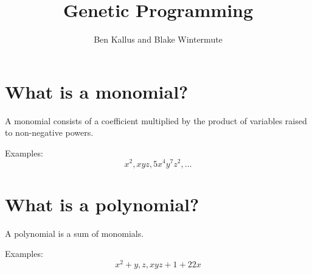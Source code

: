 \documentclass[12pt]{article}
\title{Genetic Programming}
\author{Ben Kallus and Blake Wintermute}
\date{ }
\begin{document}
\pagecolor{black}
\color{white}
\maketitle

\section*{What is a monomial?}

    A monomial consists of a coefficient multiplied by the product of variables raised to non-negative powers.

    Examples: $$x^2, xyz, 5x^4y^7z^2, \hdots$$

\section*{What is a polynomial?}

    A polynomial is a sum of monomials.

    Examples: $$x^2 + y, z, xyz + 1 + 22x$$

\newpage
\section*{}
\end{document}
